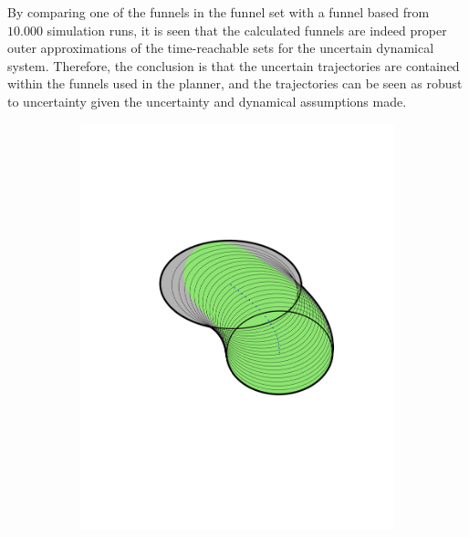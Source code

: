 By comparing one of the funnels in the funnel set with a funnel based from
\(10.000\) simulation runs, it is seen that the calculated funnels are indeed
proper outer approximations of the time-reachable sets for the uncertain
dynamical system. Therefore, the conclusion is that the uncertain trajectories
are contained within the funnels used in the planner, and the trajectories can
be seen as robust to uncertainty given the uncertainty and dynamical assumptions
made.

\begin{figure}
  \begin{subfigure}[c]{0.3\textwidth}
    \includegraphics[width=.95\textwidth, trim={0cm 4cm 0cm
      4cm}]{figures/method/FunnelSimnew4}
  \end{subfigure}
  \begin{subfigure}[c]{0.3\textwidth}

\end{subfigure}
\end{figure}

